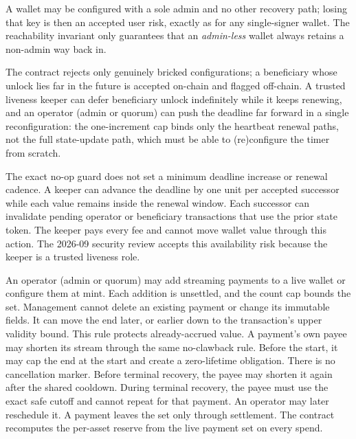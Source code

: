 \begin{description}[leftmargin=1.4em,style=nextline]
\item[Admin-only wallets are permitted.] A wallet may be configured with a sole admin and no other recovery path; losing that key is then an accepted user risk, exactly as for any single-signer wallet. The reachability invariant only guarantees that an \emph{admin-less} wallet always retains a non-admin way back in.
\item[Shape, not timing, of recovery.] The contract rejects only genuinely bricked configurations; a beneficiary whose unlock lies far in the future is accepted on-chain and flagged off-chain. A trusted liveness keeper can defer beneficiary unlock indefinitely while it keeps renewing, and an operator (admin or quorum) can push the deadline far forward in a single reconfiguration: the one-increment cap binds only the heartbeat renewal paths, not the full state-update path, which must be able to (re)configure the timer from scratch.
\item[Authorized proof-of-life renewal contention.] The exact no-op guard does not set a minimum deadline increase or renewal cadence. A keeper can advance the deadline by one unit per accepted successor while each value remains inside the renewal window. Each successor can invalidate pending operator or beneficiary transactions that use the prior state token. The keeper pays every fee and cannot move wallet value through this action. The 2026-09 security review accepts this availability risk because the keeper is a trusted liveness role.
\item[Streaming payments are additive and end-date governed.] An operator (admin or quorum) may add streaming payments to a live wallet or configure them at mint. Each addition is unsettled, and the count cap bounds the set. Management cannot delete an existing payment or change its immutable fields. It can move the end later, or earlier down to the transaction's upper validity bound. This rule protects already-accrued value. A payment's own payee may shorten its stream through the same no-clawback rule. Before the start, it may cap the end at the start and create a zero-lifetime obligation. There is no cancellation marker. Before terminal recovery, the payee may shorten it again after the shared cooldown. During terminal recovery, the payee must use the exact safe cutoff and cannot repeat for that payment. An operator may later reschedule it. A payment leaves the set only through settlement. The contract recomputes the per-asset reserve from the live payment set on every spend.

\end{description}
